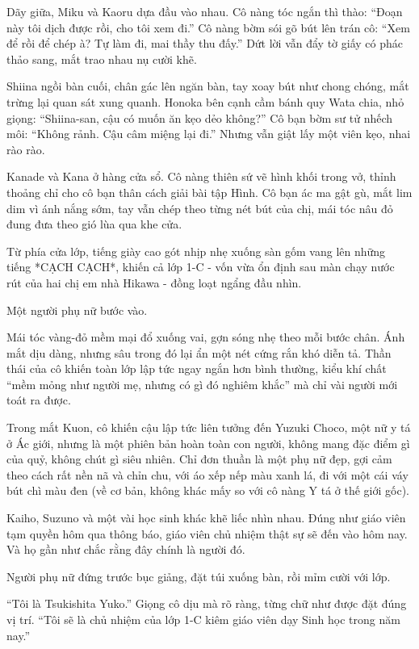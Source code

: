 \documentclass[../main.tex]{subfiles}
\begin{document}
Dãy giữa, Miku và Kaoru dựa đầu vào nhau. Cô nàng tóc ngắn thì thào: ``Đoạn này tôi dịch được rồi, cho tôi xem đi.'' Cô nàng bờm sói gõ bút lên trán cô: ``Xem để rồi để chép à? Tự làm đi, mai thầy thu đấy.'' Dứt lời vẫn đẩy tờ giấy có phác thảo sang, mắt trao nhau nụ cười khẽ.

Shiina ngồi bàn cuối, chân gác lên ngăn bàn, tay xoay bút như chong chóng, mắt trừng lại quan sát xung quanh. Honoka bên cạnh cầm bánh quy Wata chia, nhỏ giọng: ``Shiina-san, cậu có muốn ăn kẹo dẻo không?'' Cô bạn bờm sư tử nhếch môi: ``Không rảnh. Cậu câm miệng lại đi.'' Nhưng vẫn giật lấy một viên kẹo, nhai rào rào.

Kanade và Kana ở hàng cửa sổ. Cô nàng thiên sứ vẽ hình khối trong vở, thỉnh thoảng chỉ cho cô bạn thân cách giải bài tập Hình. Cô bạn ác ma gật gù, mắt lim dim vì ánh nắng sớm, tay vẫn chép theo từng nét bút của chị, mái tóc nâu đỏ đung đưa theo gió lùa qua khe cửa.

Từ phía cửa lớp, tiếng giày cao gót nhịp nhẹ xuống sàn gốm vang lên những tiếng *CẠCH CẠCH*, khiến cả lớp 1-C - vốn vừa ổn định sau màn chạy nước rút của hai chị em nhà Hikawa - đồng loạt ngẩng đầu nhìn.

Một người phụ nữ bước vào.

Mái tóc vàng-đỏ mềm mại đổ xuống vai, gợn sóng nhẹ theo mỗi bước chân. Ánh mắt dịu dàng, nhưng sâu trong đó lại ẩn một nét cứng rắn khó diễn tả. Thần thái của cô khiến toàn lớp lập tức ngay ngắn hơn bình thường, kiểu khí chất ``mềm mỏng như người mẹ, nhưng có gì đó nghiêm khắc'' mà chỉ vài người mới toát ra được.

Trong mắt Kuon, cô khiến cậu lập tức liên tưởng đến Yuzuki Choco, một nữ y tá ở Ác giới, nhưng là một phiên bản hoàn toàn con người, không mang đặc điểm gì của quỷ, không chút gì siêu nhiên. Chỉ đơn thuần là một phụ nữ đẹp, gợi cảm theo cách rất nền nã và chỉn chu, với áo xếp nếp màu xanh lá, đi với một cái váy bút chì màu đen (về cơ bản, không khác mấy so với cô nàng Y tá ở thế giới gốc).

Kaiho, Suzuno và một vài học sinh khác khẽ liếc nhìn nhau. Đúng như giáo viên tạm quyền hôm qua thông báo, giáo viên chủ nhiệm thật sự sẽ đến vào hôm nay. Và họ gần như chắc rằng đây chính là người đó.

Người phụ nữ đứng trước bục giảng, đặt túi xuống bàn, rồi mỉm cười với lớp.

``Tôi là Tsukishita Yuko.'' Giọng cô dịu mà rõ ràng, từng chữ như được đặt đúng vị trí. ``Tôi sẽ là chủ nhiệm của lớp 1-C kiêm giáo viên dạy Sinh học trong năm nay.''
\end{document}
